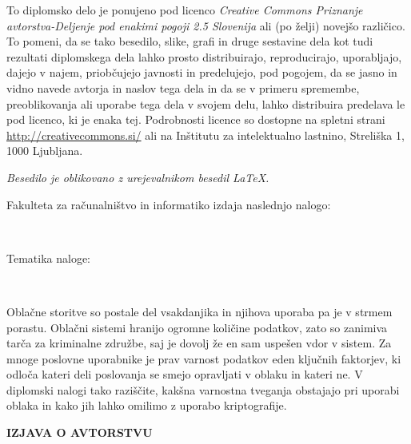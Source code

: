 \documentclass[12pt,a4paper,openany,tikz]{book}
\theoremstyle{plain}
\theoremstyle{definition}
\begin{document}
\vspace*{5cm}
{\small \noindent
To diplomsko delo je ponujeno pod licenco \textit{Creative Commons Priznanje avtorstva-Deljenje pod enakimi pogoji 2.5 Slovenija}
ali (po želji) novejšo različico.
To pomeni, da se tako besedilo, slike, grafi in druge sestavine dela kot tudi rezultati diplomskega dela lahko prosto distribuirajo,
reproducirajo, uporabljajo, dajejo v najem, priobčujejo javnosti in predelujejo, pod pogojem, da se jasno in vidno navede avtorja in naslov tega
dela in da se v primeru spremembe, preoblikovanja ali uporabe tega dela v svojem delu, lahko distribuira predelava le pod
licenco, ki je enaka tej.
Podrobnosti licence so dostopne na spletni strani \url{http://creativecommons.si/} ali na Inštitutu za
intelektualno lastnino, Streliška 1, 1000 Ljubljana.

\begin{center}%
  \hspace*{1ex}
\end{center}
}

\begin{center}
\vfill
{\em
Besedilo je oblikovano z urejevalnikom besedil \LaTeX.
}
\end{center}

\cleardoublepage

Fakulteta za računalništvo in informatiko izdaja naslednjo nalogo:

\

Tematika naloge:

\

Oblačne storitve so postale del vsakdanjika in njihova uporaba pa je v strmem porastu. Oblačni sistemi hranijo ogromne količine podatkov, zato so zanimiva tarča za kriminalne združbe, saj je dovolj že en sam uspešen vdor v sistem. Za mnoge poslovne uporabnike je prav varnost podatkov eden ključnih faktorjev, ki odloča kateri deli poslovanja se smejo opravljati v oblaku in kateri ne.
V diplomski nalogi tako raziščite, kakšna varnostna tveganja obstajajo pri uporabi oblaka in kako jih lahko omilimo z uporabo kriptografije.


\cleardoublepage

\vspace{1cm}
\begin{center}
{\Large \textbf{IZJAVA O AVTORSTVU}}
\end{center}
\end{document}
